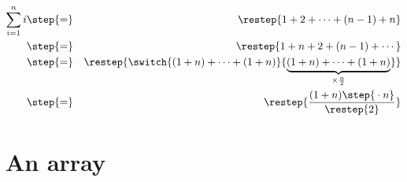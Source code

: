 \documentclass{article}
\begin{document}
\parstepwise
{%
  \begin{eqnarray}
    \sum_{i=1}^{n} i & \step{=} & \restep{1 + 2 + \cdots + (n-1) + n}\\
                     & \step{=} & \restep{1 + n + 2 + (n-1) + \cdots}\\
                     & \step{=} & \restep
                                  {%
                                    \switch
                                    {%
                                      \vphantom{\underbrace{(1 + n) + \cdots + (1 + n)}_{\times\frac{n}{2}}}%
                                      (1 + n) + \cdots + (1 + n)%
                                      }
                                    {\underbrace{(1 + n) + \cdots + (1 + n)}_{\times\frac{n}{2}}}%
                                    }
                                  \\
                     & \step{=} & \restep{\frac{(1 + n)\step{{}\cdot n}}{\restep{2}}}
  \end{eqnarray}
}




\section{An array}
\end{document}
